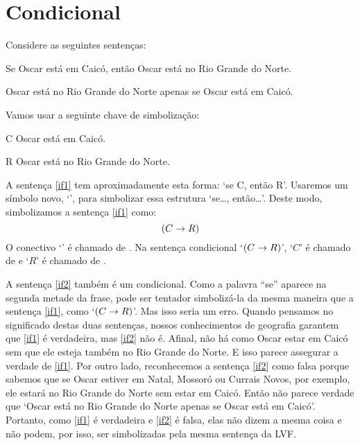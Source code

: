 \section{Condicional}
Considere as seguintes sentenças:
	\begin{earg}
		\item[\ex{if1}] Se Oscar está em Caicó, então Oscar está no Rio Grande do Norte.
		\item[\ex{if2}] Oscar está no Rio Grande do Norte apenas se Oscar está em Caicó.
	\end{earg}
Vamos usar a seguinte chave de simbolização:
	\begin{ekey}
		\item[C] Oscar está em Caicó.
		\item[R] Oscar está no Rio Grande do Norte.
	\end{ekey}
A sentença \ref{if1} tem aproximadamente esta forma: `se C, então R'.
Usaremos um símbolo novo, `\eif', para simbolizar essa estrutura `se\ldots, então\ldots'.
Deste modo, simbolizamos a sentença \ref{if1} como:
$$(C \rightarrow R)$$
O conectivo `\eif' é chamado de .
Na sentença condicional `$(C \rightarrow R)$', `$C$' é chamado de  e `$R$' é chamado de .

A sentença \ref{if2} também é um condicional.
Como a palavra ``se'' aparece na segunda metade da frase, pode ser tentador simbolizá-la da mesma maneira que a sentença \ref{if1}, como `$(C \rightarrow R)$'.
Mas isso seria um erro.
Quando pensamos no significado destas duas sentenças, nossos conhecimentos de geografia garantem que \ref{if1} é verdadeira, mas \ref{if2} não é.
Afinal, não há como Oscar estar em Caicó sem que ele esteja também no Rio Grande do Norte.
E isso parece assegurar a verdade de \ref{if1}.
Por outro lado, reconhecemos a sentença \ref{if2} como falsa porque sabemos que se Oscar estiver em Natal, Mossoró ou Currais Novos, por exemplo, ele estará no Rio Grande do Norte sem estar em Caicó.
Então não parece verdade que `Oscar está no Rio Grande do Norte apenas se Oscar está em Caicó'.
Portanto, como \ref{if1} é verdadeira e \ref{if2} é falsa, elas não dizem a mesma coisa e não podem, por isso, ser simbolizadas pela mesma sentença da  LVF.

